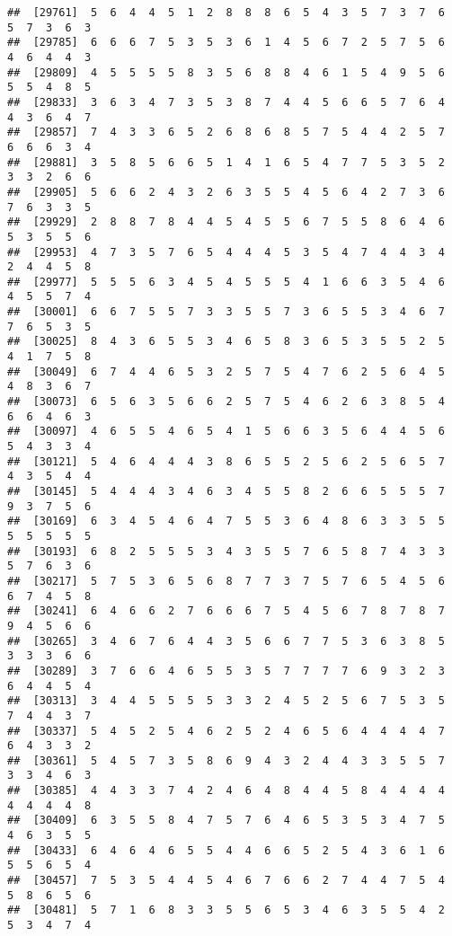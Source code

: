 \documentclass[
]{book}
\begin{document}
\begin{verbatim}
##  [29761]  5  6  4  4  5  1  2  8  8  8  6  5  4  3  5  7  3  7  6  5  7  3  6  3
##  [29785]  6  6  6  7  5  3  5  3  6  1  4  5  6  7  2  5  7  5  6  4  6  4  4  3
##  [29809]  4  5  5  5  5  8  3  5  6  8  8  4  6  1  5  4  9  5  6  5  5  4  8  5
##  [29833]  3  6  3  4  7  3  5  3  8  7  4  4  5  6  6  5  7  6  4  4  3  6  4  7
##  [29857]  7  4  3  3  6  5  2  6  8  6  8  5  7  5  4  4  2  5  7  6  6  6  3  4
##  [29881]  3  5  8  5  6  6  5  1  4  1  6  5  4  7  7  5  3  5  2  3  3  2  6  6
##  [29905]  5  6  6  2  4  3  2  6  3  5  5  4  5  6  4  2  7  3  6  7  6  3  3  5
##  [29929]  2  8  8  7  8  4  4  5  4  5  5  6  7  5  5  8  6  4  6  5  3  5  5  6
##  [29953]  4  7  3  5  7  6  5  4  4  4  5  3  5  4  7  4  4  3  4  2  4  4  5  8
##  [29977]  5  5  5  6  3  4  5  4  5  5  5  4  1  6  6  3  5  4  6  4  5  5  7  4
##  [30001]  6  6  7  5  5  7  3  3  5  5  7  3  6  5  5  3  4  6  7  7  6  5  3  5
##  [30025]  8  4  3  6  5  5  3  4  6  5  8  3  6  5  3  5  5  2  5  4  1  7  5  8
##  [30049]  6  7  4  4  6  5  3  2  5  7  5  4  7  6  2  5  6  4  5  4  8  3  6  7
##  [30073]  6  5  6  3  5  6  6  2  5  7  5  4  6  2  6  3  8  5  4  6  6  4  6  3
##  [30097]  4  6  5  5  4  6  5  4  1  5  6  6  3  5  6  4  4  5  6  5  4  3  3  4
##  [30121]  5  4  6  4  4  4  3  8  6  5  5  2  5  6  2  5  6  5  7  4  3  5  4  4
##  [30145]  5  4  4  4  3  4  6  3  4  5  5  8  2  6  6  5  5  5  7  9  3  7  5  6
##  [30169]  6  3  4  5  4  6  4  7  5  5  3  6  4  8  6  3  3  5  5  5  5  5  5  5
##  [30193]  6  8  2  5  5  5  3  4  3  5  5  7  6  5  8  7  4  3  3  5  7  6  3  6
##  [30217]  5  7  5  3  6  5  6  8  7  7  3  7  5  7  6  5  4  5  6  6  7  4  5  8
##  [30241]  6  4  6  6  2  7  6  6  6  7  5  4  5  6  7  8  7  8  7  9  4  5  6  6
##  [30265]  3  4  6  7  6  4  4  3  5  6  6  7  7  5  3  6  3  8  5  3  3  3  6  6
##  [30289]  3  7  6  6  4  6  5  5  3  5  7  7  7  7  6  9  3  2  3  6  4  4  5  4
##  [30313]  3  4  4  5  5  5  5  3  3  2  4  5  2  5  6  7  5  3  5  7  4  4  3  7
##  [30337]  5  4  5  2  5  4  6  2  5  2  4  6  5  6  4  4  4  4  7  6  4  3  3  2
##  [30361]  5  4  5  7  3  5  8  6  9  4  3  2  4  4  3  3  5  5  7  3  3  4  6  3
##  [30385]  4  4  3  3  7  4  2  4  6  4  8  4  4  5  8  4  4  4  4  4  4  4  4  8
##  [30409]  6  3  5  5  8  4  7  5  7  6  4  6  5  3  5  3  4  7  5  4  6  3  5  5
##  [30433]  6  4  6  4  6  5  5  4  4  6  6  5  2  5  4  3  6  1  6  5  5  6  5  4
##  [30457]  7  5  3  5  4  4  5  4  6  7  6  6  2  7  4  4  7  5  4  5  8  6  5  6
##  [30481]  5  7  1  6  8  3  3  5  5  6  5  3  4  6  3  5  5  4  2  5  3  4  7  4

\end{verbatim}
\end{document}
